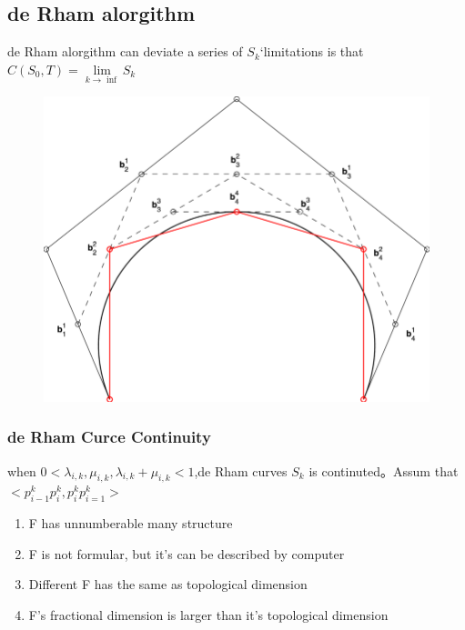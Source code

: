 \newpage


\subsection{de Rham alorgithm}
de Rham alorgithm can deviate a series of $S_k$‘limitations is that $C(S_0,T) = \lim\limits_{k\rightarrow \inf}S_k$


\begin{figure}
	\begin{center}
		\includegraphics[scale=1]{img/1.png}
	\end{center}
	\caption{}\label{fig:}
\end{figure}

\subsubsection{de Rham Curce Continuity}

\begin{property}[Continuity]
	when $0<\lambda _{i,k},\mu_{i,k},\lambda_{i,k}+\mu_{i,k}<1$,de Rham curves $S_k$ is continuted。Assum that $<p_{i-1}^{k}p_{i}^{k},p_{i}^{k}p_{i=1}^{k}>$
\end{property}

\begin{property}
	\begin{enumerate}
		\item F has unnumberable many structure
		\item F is not formular, but it's can be described by computer
		\item Different F has the same as topological dimension
		\item F's fractional dimension is larger than it's topological dimension
	\end{enumerate}
\end{property}
